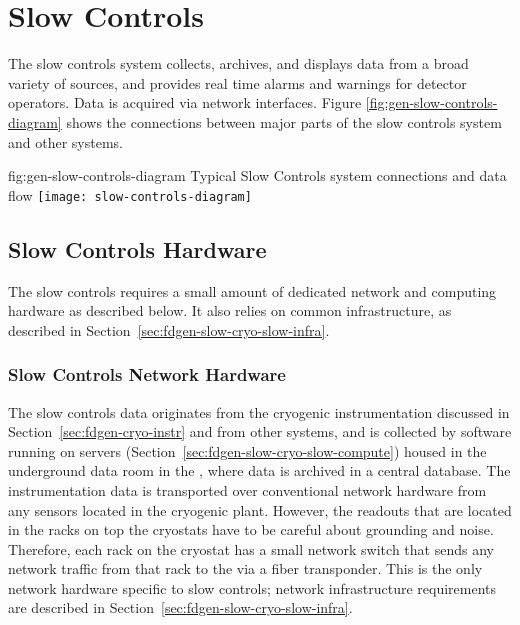\section{Slow Controls}
\label{sec:fdgen-slow-cryo-ctrl}


The slow controls system collects, archives, and displays data from
a broad variety of sources, and provides real time alarms and
warnings for detector operators. Data is acquired via network
interfaces.  Figure \ref{fig:gen-slow-controls-diagram} shows the
connections between major parts of the slow controls system and other
systems.  %

\begin{dunefigure}{fig:gen-slow-controls-diagram}
{Typical Slow Controls system connections and data flow}
\texttt{[image: slow-controls-diagram]}
\end{dunefigure}





\subsection{Slow Controls Hardware}
\label{sec:fdgen-slow-cryo-hdwr}

The slow controls requires a small amount of dedicated network and
computing hardware as described below.  It also relies on common
infrastructure, as described in
Section~\ref{sec:fdgen-slow-cryo-slow-infra}.

\subsubsection{Slow Controls Network Hardware}
\label{sec:fdgen-slow-cryo-slow-network}
The slow controls data originates from the cryogenic instrumentation discussed in
Section~\ref{sec:fdgen-cryo-instr} and from other systems,
and is collected by software running on servers
(Section~\ref{sec:fdgen-slow-cryo-slow-compute})
housed in the underground data room in the ,
where data is archived in a central  database.
The instrumentation data is transported over
conventional network hardware from any sensors located in the cryogenic
plant.  However, the readouts that are located in the racks on top the
cryostats have to be careful about grounding and noise.  Therefore, each
rack on the cryostat has a small network switch that sends
any network traffic from that rack to the  via a fiber transponder.
This is the only network hardware specific to slow controls;
network infrastructure requirements are described in
Section~\ref{sec:fdgen-slow-cryo-slow-infra}.

